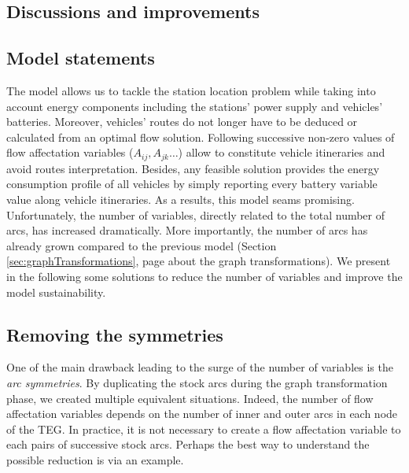 \begin{bibunit}[ieeetr]
\section{Discussions and improvements}
\subsection{Model statements}

The model {\ENERGY} allows us to tackle the station location problem while taking into account energy components including the stations' power supply and vehicles' batteries.
Moreover, vehicles' routes do not longer have to be deduced or calculated from an optimal flow solution.
Following successive non-zero values of flow affectation variables (\ie $A_{ij}, A_{jk} \dots$) allow to constitute vehicle itineraries and avoid routes interpretation.
Besides, any feasible solution provides the energy consumption profile of all vehicles by simply reporting every battery variable value along vehicle itineraries.
As a results, this model seams promising.
Unfortunately, the number of variables, directly related to the total number of arcs, has increased dramatically.
More importantly, the number of arcs has already grown compared to the previous model (\see Section \ref{sec:graphTransformations}, page \pageref{sec:graphTransformations} about the graph transformations).
We present in the following some solutions to reduce the number of variables and improve the model sustainability.



\subsection{Removing the symmetries}
One of the main drawback leading to the surge of the number of variables is the \emph{arc symmetries}.
By duplicating the stock arcs during the graph transformation phase, we created multiple equivalent situations.
Indeed, the number of flow affectation variables depends on the number of inner and outer arcs in each node of the TEG.
In practice, it is not necessary to create a flow affectation variable to each pairs of successive stock arcs.
Perhaps the best way to understand the possible reduction is via an example.


\end{bibunit}
